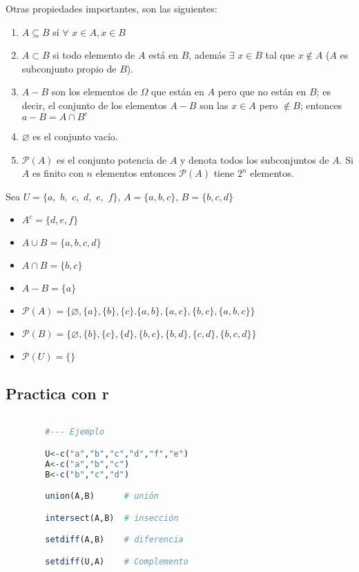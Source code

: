 Otras propiedades importantes, son las siguientes:
\begin{enumerate}[1]

\item $A\subseteq B$ sí $\forall$ $x\in A,x\in B$

\item $A\subset B$ si todo elemento de $A$ está en $B$, además $\exists $ $x\in B$ tal que $x\notin A$ ($A$ es subconjunto propio de $B$).

\item $A-B$ son los elementos de $\Omega$ que están en $A$ pero que no están en $B$; es decir, el conjunto de los elementos $A-B$ son las $x\in A$ pero $\notin B$; entonces $a-B=A\cap B^{c} $ 
\item $\varnothing$ es el conjunto vacío.
\item $\mathcal{P}(A)$ es el conjunto potencia de $A$ y denota todos los subconjuntos de $A.$ Si $A$ es finito con $n$ elementos entonces $\mathcal{P}(A)$ tiene $2^{n}$ elementos.
\end{enumerate}

\begin{exercise}
Sea $U=\{a,$ $b,$ $c,$ $d,$ $e,$ $f\}$, $A=\{a,b,c\}$, $B=\{b,c,d\}$ 
\end{exercise}


\begin{solution}
\begin{itemize}[b]
\item $A^{c} =\{d,e,f\} $
\item $A\cup B =\{a,b,c,d\}$
\item $A\cap B =\{b,c\}$
\item $A-B =\{a\}$
\item $\mathcal{P}(A) =\{\varnothing
,\{a\},\{b\},\{c\}.\{a,b\},\{a,c\},\{b,c\},\{a,b,c\}\}$
\item $\mathcal{P}(B) =\{\varnothing
,\{b\},\{c\},\{d\},\{b,c\},\{b,d\},\{c,d\},\{b,c,d\}\}$
\item $\mathcal{P}(U) =\{\}$
\end{itemize}    
\end{solution}


\subsection{Practica con r}



\begin{lstlisting}[language=R]

        #--- Ejemplo

        U<-c("a","b","c","d","f","e")
        A<-c("a","b","c")
        B<-c("b","c","d")

        union(A,B)      # unión

        intersect(A,B)  # insección

        setdiff(A,B)    # diferencia

        setdiff(U,A)    # Complemento
\end{lstlisting}


